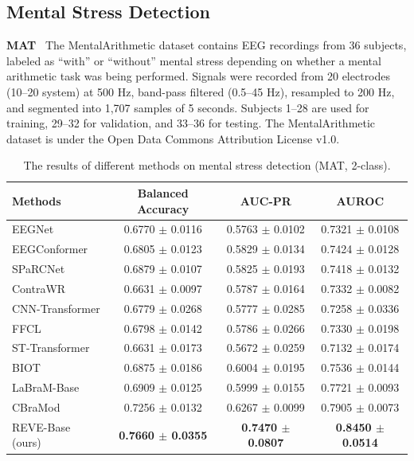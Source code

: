 \documentclass{article}
\begin{document}
\subsection{Mental Stress Detection}

\textbf{MAT}~\citep{zyma2019electroencephalograms} 
The MentalArithmetic dataset contains EEG recordings from 36 subjects, labeled as “with” or “without” mental stress depending on whether a mental arithmetic task was being performed. Signals were recorded from 20 electrodes (10–20 system) at 500 Hz, band-pass filtered (0.5–45 Hz), resampled to 200 Hz, and segmented into 1,707 samples of 5 seconds. Subjects 1–28 are used for training, 29–32 for validation, and 33–36 for testing. The MentalArithmetic dataset is under the Open Data Commons Attribution License v1.0.

\begin{table}[H]
\centering
\caption{The results of different methods on mental stress detection (MAT, 2-class).}
\small
\begin{tabular}{lccc} 
\toprule
\textbf{Methods} & \textbf{Balanced Accuracy} & \textbf{AUC-PR} & \textbf{AUROC} \\
\midrule
EEGNet            & 0.6770 $\pm$ 0.0116 & 0.5763 $\pm$ 0.0102 & 0.7321 $\pm$ 0.0108 \\
EEGConformer      & 0.6805 $\pm$ 0.0123 & 0.5829 $\pm$ 0.0134 & 0.7424 $\pm$ 0.0128 \\
SPaRCNet          & 0.6879 $\pm$ 0.0107 & 0.5825 $\pm$ 0.0193 & 0.7418 $\pm$ 0.0132 \\
ContraWR          & 0.6631 $\pm$ 0.0097 & 0.5787 $\pm$ 0.0164 & 0.7332 $\pm$ 0.0082 \\
CNN-Transformer   & 0.6779 $\pm$ 0.0268 & 0.5777 $\pm$ 0.0285 & 0.7258 $\pm$ 0.0336 \\
FFCL              & 0.6798 $\pm$ 0.0142 & 0.5786 $\pm$ 0.0266 & 0.7330 $\pm$ 0.0198 \\
ST-Transformer    & 0.6631 $\pm$ 0.0173 & 0.5672 $\pm$ 0.0259 & 0.7132 $\pm$ 0.0174 \\
\midrule
BIOT              & 0.6875 $\pm$ 0.0186 & 0.6004 $\pm$ 0.0195 & 0.7536 $\pm$ 0.0144 \\
LaBraM-Base       & 0.6909 $\pm$ 0.0125 & 0.5999 $\pm$ 0.0155 & 0.7721 $\pm$ 0.0093 \\
CBraMod           & 0.7256 $\pm$ 0.0132 & 0.6267 $\pm$ 0.0099 & 0.7905 $\pm$ 0.0073 \\
\midrule
REVE-Base (ours)        & \textbf{0.7660 $\pm$ 0.0355} & \textbf{0.7470 $\pm$ 0.0807} & \textbf{0.8450 $\pm$ 0.0514}  \\
\bottomrule
\end{tabular}

\label{tab:Stress}
\end{table}
\end{document}
